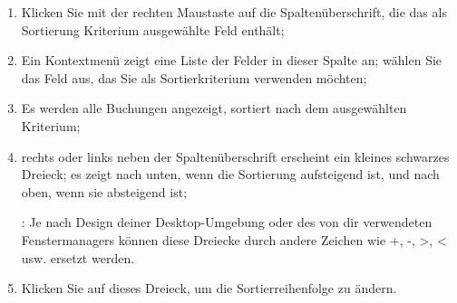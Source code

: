 \begin{enumerate}
	\item Klicken Sie mit der rechten Maustaste auf die Spaltenüberschrift, die das als \gls{Sortierung} Kriterium ausgewählte Feld enthält;
	\item Ein Kontextmenü zeigt eine Liste der Felder in dieser Spalte an; wählen Sie das Feld aus, das Sie als Sortierkriterium verwenden möchten;
	\item Es werden alle Buchungen angezeigt, sortiert nach dem ausgewählten Kriterium;
	\item rechts oder links neben der Spaltenüberschrift erscheint ein kleines schwarzes Dreieck; es zeigt nach unten, wenn die Sortierung aufsteigend ist, und nach oben, wenn sie absteigend ist;
	
	\Note{}: Je nach Design deiner Desktop-Umgebung oder des von dir verwendeten Fenstermanagers können diese Dreiecke durch andere Zeichen wie +, -, >, < usw. ersetzt werden.
	\item Klicken Sie auf dieses Dreieck, um die Sortierreihenfolge zu ändern.
\end{enumerate}


